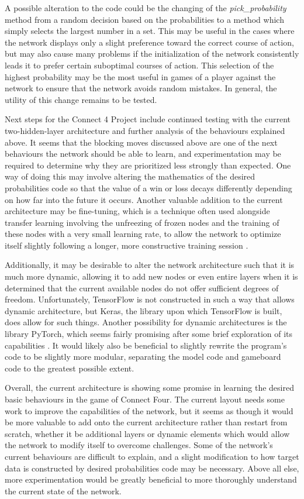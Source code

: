 \documentclass[12pt]{article}
\begin{document}
A possible alteration to the code could be the changing of the \textit{pick\_probability} method from a random decision based on the probabilities to a method which simply selects the largest number in a set. This may be useful in the cases where the network displays only a slight preference toward the correct course of action, but may also cause many problems if the initialization of the network consistently leads it to prefer certain suboptimal courses of action. This selection of the highest probability may be the most useful in games of a player against the network to ensure that the network avoids random mistakes. In general, the utility of this change remains to be tested.

Next steps for the Connect 4 Project include continued testing with the current two-hidden-layer architecture and further analysis of the behaviours explained above. It seems that the blocking moves discussed above are one of the next behaviours the network should be able to learn, and experimentation may be required to determine why they are prioritized less strongly than expected. One way of doing this may involve altering the mathematics of the desired probabilities code so that the value of a win or loss decays differently depending on how far into the future it occurs. Another valuable addition to the current architecture may be fine-tuning, which is a technique often used alongside transfer learning involving the unfreezing of frozen nodes and the training of these nodes with a very small learning rate, to allow the network to optimize itself slightly following a longer, more constructive training session \cite{TransferLearning}.

Additionally, it may be desirable to alter the network architecture such that it is much more dynamic, allowing it to add new nodes or even entire layers when it is determined that the current available nodes do not offer sufficient degrees of freedom. Unfortunately, TensorFlow is not constructed in such a way that allows dynamic architecture, but Keras, the library upon which TensorFlow is built, does allow for such things. Another possibility for dynamic architectures is the library PyTorch, which seems fairly promising after some brief exploration of its capabilities \cite{PyTorch}. It would likely also be beneficial to slightly rewrite the program’s code to be slightly more modular, separating the model code and gameboard code to the greatest possible extent.

Overall, the current architecture is showing some promise in learning the desired basic behaviours in the game of Connect Four. The current layout needs some work to improve the capabilities of the network, but it seems as though it would be more valuable to add onto the current architecture rather than restart from scratch, whether it be additional layers or dynamic elements which would allow the network to modify itself to overcome challenges. Some of the network’s current behaviours are difficult to explain, and a slight modification to how target data is constructed by desired probabilities code may be necessary. Above all else, more experimentation would be greatly beneficial to more thoroughly understand the current state of the network.
\end{document}
